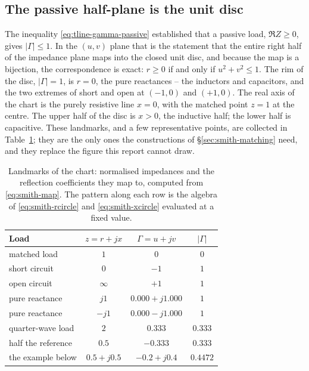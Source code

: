 \subsection{The passive half-plane is the unit disc}
\label{sec:smith-passive}

The inequality \eqref{eq:tline-gamma-passive} established that a passive load, $\Re Z\ge 0$, gives
$|\Gamma|\le1$. In the $(u,v)$ plane that is the statement that the entire right half of the impedance plane maps
into the closed unit disc, and because the map is a bijection, the correspondence is exact: $r\ge0$ if and only
if $u^2+v^2\le1$. The rim of the disc, $|\Gamma|=1$, is $r=0$, the pure reactances -- the inductors and
capacitors, and the two extremes of short and open at $(-1,0)$ and $(+1,0)$. The real axis of the chart is the
purely resistive line $x=0$, with the matched point $z=1$ at the centre. The upper half of the disc is
$x>0$, the inductive half; the lower half is capacitive. These landmarks, and a few representative points, are
collected in Table~\ref{tab:smith-landmarks}; they are the only ones the constructions of
\S\ref{sec:smith-matching} need, and they replace the figure this report cannot draw.

\begin{table}[H]
  \centering
  \caption{Landmarks of the chart: normalised impedances and the reflection coefficients they map to, computed from \eqref{eq:smith-map}. The pattern along each row is the algebra of \eqref{eq:smith-rcircle} and \eqref{eq:smith-xcircle} evaluated at a fixed value.}
  \label{tab:smith-landmarks}
  \small
  \begin{tabular}{@{}lccc@{}}
    \toprule
    Load & $z=r+jx$ & $\Gamma=u+jv$ & $|\Gamma|$ \\
    \midrule
    matched load        & $1$              & $0$              & $0$ \\
    short circuit       & $0$              & $-1$             & $1$ \\
    open circuit        & $\infty$         & $+1$             & $1$ \\
    pure reactance      & $j1$             & $0.000+j1.000$   & $1$ \\
    pure reactance      & $-j1$            & $0.000-j1.000$   & $1$ \\
    quarter-wave load   & $2$              & $0.333$          & $0.333$ \\
    half the reference  & $0.5$            & $-0.333$         & $0.333$ \\
    the example below   & $0.5+j0.5$       & $-0.2+j0.4$      & $0.4472$ \\
    \bottomrule
  \end{tabular}
\end{table}

